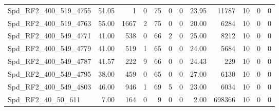 \begin{longtable}[c]{@{}lrrrrrrrrrrr@{}}
Spd\_RF2\_400\_519\_4755     & 51.05                  & 1                       & 0                       & 75                     & 0                       & 0                       & 23.95                   & 11787                    & 10                       & 0                        & 0                        \\
Spd\_RF2\_400\_519\_4763     & 55.00                  & 1667                    & 2                       & 75                     & 0                       & 0                       & 20.00                   & 6284                     & 10                       & 0                        & 0                        \\
Spd\_RF2\_400\_549\_4771     & 41.00                  & 538                     & 0                       & 66                     & 2                       & 0                       & 25.00                   & 8212                     & 10                       & 0                        & 0                        \\
Spd\_RF2\_400\_549\_4779     & 41.00                  & 519                     & 1                       & 65                     & 0                       & 0                       & 24.00                   & 5684                     & 10                       & 0                        & 0                        \\
Spd\_RF2\_400\_549\_4787     & 41.57                  & 222                     & 9                       & 66                     & 0                       & 0                       & 24.43                   & 229                      & 10                       & 0                        & 0                        \\
Spd\_RF2\_400\_549\_4795     & 38.00                  & 459                     & 0                       & 65                     & 0                       & 0                       & 27.00                   & 6130                     & 10                       & 0                        & 0                        \\
Spd\_RF2\_400\_549\_4803     & 46.00                  & 946                     & 1                       & 69                     & 5                       & 0                       & 23.00                   & 6034                     & 10                       & 0                        & 0                        \\
Spd\_RF2\_40\_50\_611        & 7.00                   & 164                     & 0                       & 9                      & 0                       & 0                       & 2.00                    & 698366                   & 10                       & 0                        & 0                        \\

\end{longtable}
